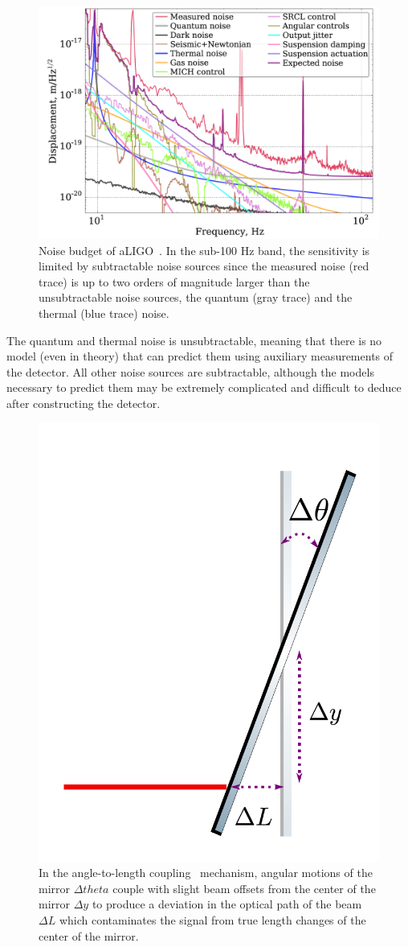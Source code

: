 \begin{refsection}
\begin{figure}[htbp]
   \centering
   \includegraphics[width=\columnwidth]{chapter_noise_sub/etc/noiseBudget}
   \caption[Noise Budget]{Noise budget of aLIGO~\cite{Martynov:16}.
     In the sub-100 Hz band, the sensitivity is limited by subtractable noise sources since the measured noise (red trace) is up to two orders of magnitude larger than the unsubtractable noise sources, the quantum (gray trace) and the thermal (blue trace) noise.}
   \label{fig:noiseBudget}
\end{figure}

The quantum and thermal noise is unsubtractable, meaning that there is no model (even in theory) that can predict them using auxiliary measurements of the detector. All other noise sources are subtractable, although the models necessary to predict them may be extremely complicated and difficult to deduce after constructing the detector. 


\begin{figure}[htbp]
   \centering
   \includegraphics[width=0.28\columnwidth]{chapter_noise_sub/etc/a2l}
   \caption{In the angle-to-length coupling~\cite{Yu:19} mechanism, angular motions of the mirror $\Delta theta$ couple with slight beam offsets from the center of the mirror $\Delta y$ to produce a deviation in the optical path of the beam $\Delta L$ which contaminates the signal from true length changes of the center of the mirror.}
   \label{fig:a2l}
\end{figure}


\end{refsection}
